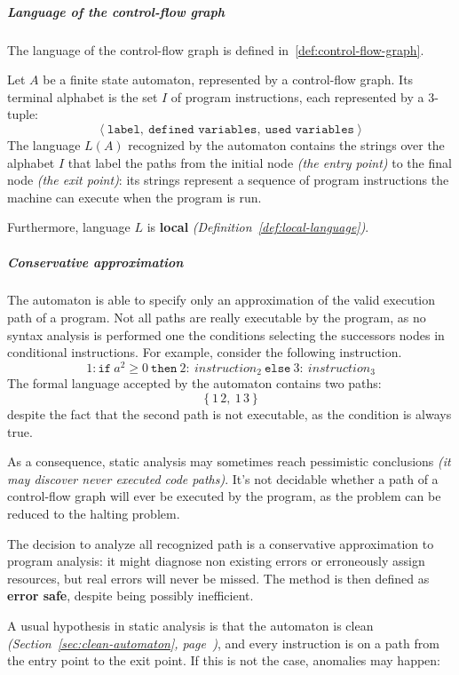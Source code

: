 \documentclass[english]{article}
\begin{document}
\subparagraph*{Language of the control-flow graph}
The language of the control-flow graph is defined in~\ref{def:control-flow-graph}.

\begin{definition}
  \label{def:control-flow-graph}
  Let \(A\) be a finite state automaton, represented by a control-flow graph.
  Its terminal alphabet is the set \(I\) of program instructions, each represented by a \(3\)-tuple:
  \[ \left\langle \texttt{label},\ \texttt{defined variables},\ \texttt{used variables} \right\rangle \]
  The language \(L(A)\) recognized by the automaton contains the strings over the alphabet \(I\) that label the paths from the initial node \textit{(the entry point)} to the final node \textit{(the exit point)}:
  its strings represent a sequence of program instructions the machine can execute when the program is run.
\end{definition}

Furthermore, language \(L\) is \textbf{local} \textit{(Definition~\ref{def:local-language})}.

\subparagraph*{Conservative approximation}

The automaton is able to specify only an approximation of the valid execution path of a program.
Not all paths are really executable by the program, as no syntax analysis is performed one the conditions selecting the successors nodes in conditional instructions.
For example, consider the following instruction.
\[ 1: \texttt{if} \ a^2 \geq 0 \ \texttt{then} \ 2: \ \textit{instruction}_2 \ \texttt{else} \ 3: \ \textit{instruction}_3 \]
The formal language accepted by the automaton contains two paths:
\[ \left\{ 1 \, 2, \ 1 \, 3 \right\} \]
despite the fact that the second path is not executable, as the condition is always true.

As a consequence, static analysis may sometimes reach pessimistic conclusions \textit{(it may discover never executed code paths)}.
It's not decidable whether a path of a control-flow graph will ever be executed by the program, as the problem can be reduced to the halting problem.

The decision to analyze all recognized path is a conservative approximation to program analysis:
it might diagnose non existing errors or erroneously assign resources, but real errors will never be missed.
The method is then defined as \textbf{error safe}, despite being possibly inefficient.

A usual hypothesis in static analysis is that the automaton is clean \textit{(Section~\ref{sec:clean-automaton}, page~\pageref{sec:clean-automaton})}, and every instruction is on a path from the entry point to the exit point.
If this is not the case, anomalies may happen:
\end{document}
